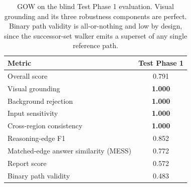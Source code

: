 \begin{table}[t]
\centering
\caption{GOW on the blind Test Phase 1 evaluation. Visual grounding and its three robustness components are
perfect. Binary path validity is all-or-nothing and low by design, since the successor-set walker emits a
superset of any single reference path.}
\label{tab:main}
\begin{tabular}{lc}
\toprule
Metric & Test Phase 1 \\
\midrule
Overall score                         & 0.791 \\
\midrule
Visual grounding                      & \textbf{1.000} \\
\quad Background rejection             & \textbf{1.000} \\
\quad Input sensitivity               & \textbf{1.000} \\
\quad Cross-region consistency         & \textbf{1.000} \\
\midrule
Reasoning-edge F1                     & 0.852 \\
Matched-edge answer similarity (MESS) & 0.772 \\
Report score                          & 0.572 \\
Binary path validity                  & 0.483 \\
\bottomrule
\end{tabular}
\end{table}

